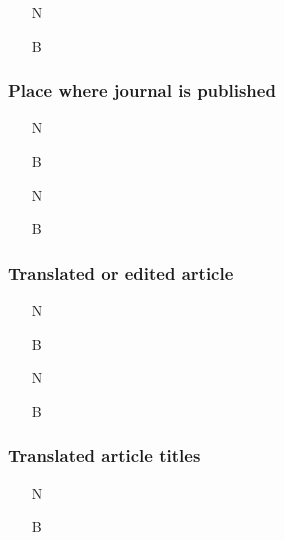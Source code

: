 \documentclass[11pt,letterpaper,oneside]{article}
\begin{document}

\begin{itemize}
\item[N] 

\item[B] 
\end{itemize}

\setcounter{subsubsection}{190}
\subsubsection{Place where journal is published}

\begin{itemize}
\item[N] 

\item[B] 

\item[N] 

\item[B] 
\end{itemize}

\subsubsection{Translated or edited article}
\label{14.192}

\begin{itemize}
\item[N] 

\item[B] 

\item[N] 

\item[B] 
\end{itemize}

\setcounter{subsubsection}{193}
\subsubsection{Translated article titles}

\begin{itemize}
\item[N] 

\item[B] 
\end{itemize}
\end{document}
